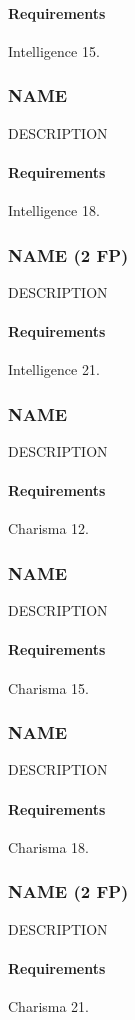     \paragraph{Requirements} Intelligence 15.
\subsubsection{NAME} \label{feat::name}
    DESCRIPTION
    \paragraph{Requirements} Intelligence 18.
\subsubsection{NAME (2 FP)} \label{feat::name}
    DESCRIPTION
    \paragraph{Requirements} Intelligence 21.
\subsubsection{NAME} \label{feat::name}
    DESCRIPTION
    \paragraph{Requirements} Charisma 12.
\subsubsection{NAME} \label{feat::name}
    DESCRIPTION
    \paragraph{Requirements} Charisma 15.
\subsubsection{NAME} \label{feat::name}
    DESCRIPTION
    \paragraph{Requirements} Charisma 18.
\subsubsection{NAME (2 FP)} \label{feat::name}
    DESCRIPTION
    \paragraph{Requirements} Charisma 21.
